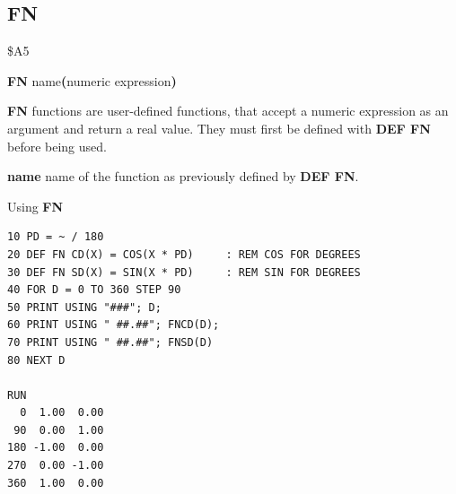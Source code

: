 
\newpage
\subsection{FN}
\begin{description}[leftmargin=2cm,style=nextline]
\item [Token:]    \$A5

\item [Format:]   {\bf FN} name{\bf(}numeric expression{\bf)}

\item [Usage:]    {\bf FN} functions are user-defined functions, that accept a numeric expression as an argument and return a real value.
                  They must first be defined with {\bf DEF FN} before being used.

                  {\bf name} name of the function as previously defined by {\bf DEF FN}.

\item [Example:]  Using {\bf FN}

\begin{tcolorbox}[colback=black,coltext=white]
\verbatimfont{\codefont}
\begin{verbatim}
10 PD = ~ / 180
20 DEF FN CD(X) = COS(X * PD)     : REM COS FOR DEGREES
30 DEF FN SD(X) = SIN(X * PD)     : REM SIN FOR DEGREES
40 FOR D = 0 TO 360 STEP 90
50 PRINT USING "###"; D;
60 PRINT USING " ##.##"; FNCD(D);
70 PRINT USING " ##.##"; FNSD(D)
80 NEXT D

RUN
  0  1.00  0.00
 90  0.00  1.00
180 -1.00  0.00
270  0.00 -1.00
360  1.00  0.00
\end{verbatim}
\end{tcolorbox}
\end{description}


\newpage
